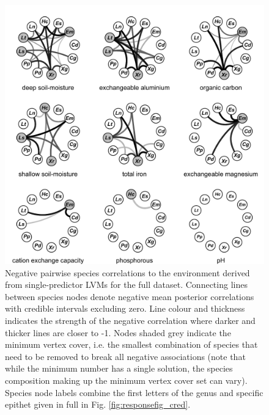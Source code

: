  \begin{figure}[H]
 \centering
 \includegraphics[width=1.0\linewidth]{Chapter5/Figures/networkplots-negfull}
 \caption{Negative pairwise species correlations to the environment derived from single-predictor LVMs for the full dataset. Connecting lines between species nodes denote negative mean posterior correlations with credible intervals excluding zero. Line colour and thickness indicates the strength of the negative correlation where darker and thicker lines are closer to -1. Nodes shaded grey indicate the minimum vertex cover, i.e. the smallest combination of species that need to be removed to break all negative associations (note that while the minimum number has a single solution, the species composition making up the minimum vertex cover set can vary). Species node labels combine the first letters of the genus and specific epithet given in full in Fig. \ref{fig:responsefig_cred}.}
 \label{fig:networkplots-negfull}
 \end{figure}
 
